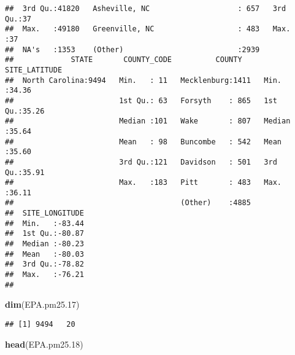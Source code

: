 \documentclass[]{article}
\newenvironment{Shaded}{\begin{snugshade}}{\end{snugshade}}
\newcommand{\KeywordTok}[1]{\textcolor[rgb]{0.13,0.29,0.53}{\textbf{#1}}}
\newcommand{\DecValTok}[1]{\textcolor[rgb]{0.00,0.00,0.81}{#1}}
\newcommand{\NormalTok}[1]{#1}
\begin{document}
\begin{verbatim}
##  3rd Qu.:41820   Asheville, NC                    : 657   3rd Qu.:37  
##  Max.   :49180   Greenville, NC                   : 483   Max.   :37  
##  NA's   :1353    (Other)                          :2939               
##             STATE       COUNTY_CODE          COUNTY     SITE_LATITUDE  
##  North Carolina:9494   Min.   : 11   Mecklenburg:1411   Min.   :34.36  
##                        1st Qu.: 63   Forsyth    : 865   1st Qu.:35.26  
##                        Median :101   Wake       : 807   Median :35.64  
##                        Mean   : 98   Buncombe   : 542   Mean   :35.60  
##                        3rd Qu.:121   Davidson   : 501   3rd Qu.:35.91  
##                        Max.   :183   Pitt       : 483   Max.   :36.11  
##                                      (Other)    :4885                  
##  SITE_LONGITUDE  
##  Min.   :-83.44  
##  1st Qu.:-80.87  
##  Median :-80.23  
##  Mean   :-80.03  
##  3rd Qu.:-78.82  
##  Max.   :-76.21  
## 
\end{verbatim}

\begin{Shaded}
\begin{Highlighting}[]
\KeywordTok{dim}\NormalTok{(EPA.pm25.}\DecValTok{17}\NormalTok{)}
\end{Highlighting}
\end{Shaded}

\begin{verbatim}
## [1] 9494   20
\end{verbatim}

\begin{Shaded}
\begin{Highlighting}[]
\KeywordTok{head}\NormalTok{(EPA.pm25.}\DecValTok{18}\NormalTok{)}
\end{Highlighting}
\end{Shaded}
\end{document}
